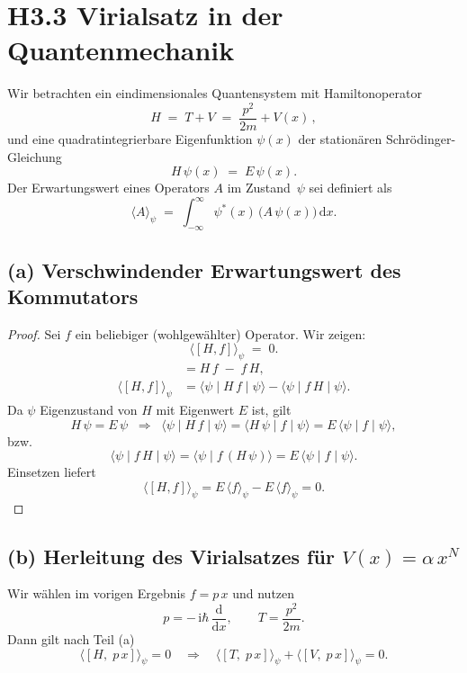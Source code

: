 \documentclass[a4paper,11pt]{article}
\theoremstyle{definition}
\begin{document}
\section*{H3.3 Virialsatz in der Quantenmechanik}

\noindent
Wir betrachten ein eindimensionales Quantensystem mit Hamiltonoperator
\[
H \;=\; T + V \;=\; \frac{p^2}{2m} + V(x)\,,
\]
und eine quadratintegrierbare Eigenfunktion $\psi(x)$ der stationären Schrödinger-Gleichung
\[
H\,\psi(x) \;=\; E\,\psi(x).
\]
Der Erwartungswert eines Operators $A$ im Zustand~$\psi$ sei definiert als
\[
\langle A\rangle_\psi \;=\;
\int_{-\infty}^{\infty}\! \psi^*(x)\,\bigl(A\,\psi(x)\bigr)\,\mathrm{d}x.
\]

\subsection*{(a) Verschwindender Erwartungswert des Kommutators}

\begin{proof}
Sei $f$ ein beliebiger (wohlgewählter) Operator. Wir zeigen:
\[
\bigl\langle [H,f]\bigr\rangle_\psi \;=\; 0.
\]
\begin{align*}
[H,f] &= H\,f \;-\; f\,H,\\
\bigl\langle [H,f]\bigr\rangle_\psi
&= \langle \psi \mid H\,f \mid \psi \rangle
  - \langle \psi \mid f\,H \mid \psi \rangle.
\end{align*}
Da $\psi$ Eigenzustand von $H$ mit Eigenwert $E$ ist, gilt
\[
H\,\psi = E\,\psi
\;\;\Longrightarrow\;\;
\langle \psi \mid H\,f \mid \psi \rangle
= \langle H\,\psi \mid f \mid \psi \rangle
= E\,\langle \psi \mid f \mid \psi \rangle,
\]
bzw.
\[
\langle \psi \mid f\,H \mid \psi \rangle
= \langle \psi \mid f\,(H\,\psi) \rangle
= E\,\langle \psi \mid f \mid \psi \rangle.
\]
Einsetzen liefert
\[
\bigl\langle [H,f]\bigr\rangle_\psi
= E\,\langle f \rangle_\psi - E\,\langle f \rangle_\psi
= 0.
\]
\end{proof}

\subsection*{(b) Herleitung des Virialsatzes für $V(x)=\alpha\,x^N$}

Wir wählen im vorigen Ergebnis $f = p\,x$ und nutzen
\[
p = -\,\mathrm{i}\hbar\,\frac{\mathrm{d}}{\mathrm{d}x},
\qquad
T = \frac{p^2}{2m}.
\]
Dann gilt nach Teil (a)
\[
\bigl\langle [H,\;p\,x]\bigr\rangle_\psi = 0
\quad\Longrightarrow\quad
\bigl\langle [T,\;p\,x]\bigr\rangle_\psi
+
\bigl\langle [V,\;p\,x]\bigr\rangle_\psi
= 0.
\]
\end{document}
